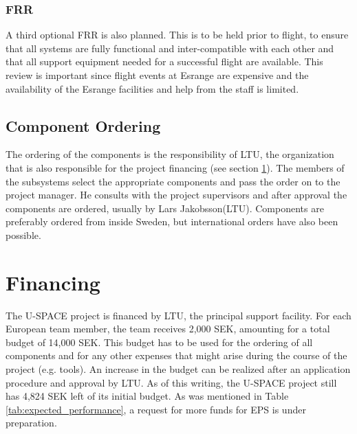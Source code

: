 \subsubsection*{\acl{FRR}}
A third optional \ac{FRR} is also planned. This is to be held prior to flight, to ensure that all systems are fully functional and inter-compatible with each other and that all support equipment needed for a successful flight are available. This review is important since flight events at Esrange are expensive and the availability of the Esrange facilities and help from the staff is limited.
%
%
\subsection{Component Ordering}
%
The ordering of the components is the responsibility of \ac{LTU}, the organization that is also responsible for the project financing (see section \ref{sec:financing}). The members of the subsystems select the appropriate components and pass the order on to the project manager. He consults with the project supervisors and after approval the components are ordered, usually by Lars Jakobsson(LTU). Components are preferably ordered from inside Sweden, but international orders have also been possible.
%
\section{Financing}
\label{sec:financing}
%
The \ac{U-SPACE} project is financed by \ac{LTU}, the principal support facility. For each European team member, the team receives 2,000 SEK, amounting for a total budget of 14,000 SEK. This budget has to be used for the ordering of all components and for any other expenses that might arise during the course of the project (e.g. tools). An increase in the budget can be realized after an application procedure and approval by \ac{LTU}. As of this writing, the \ac{U-SPACE} project still has 4,824 SEK left of its initial budget. As was mentioned in Table \ref{tab:expected_performance}, a request for more funds for \ac{EPS} is under preparation.
%
%
